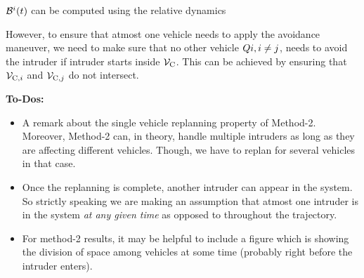 $\mathcal{B}^i(t)$ can be computed using the relative dynamics 

However, to ensure that atmost one vehicle needs to apply the avoidance maneuver, we need to make sure that no other vehicle $Q{i}, i \neq j$, needs to avoid the intruder if intruder starts inside $\mathcal{V}_\text{C}$. This can  be achieved by ensuring that $\mathcal{V}_{\text{C},i}$ and $\mathcal{V}_{\text{C},j}$ do not intersect.







\textbf{To-Dos:}
\begin{itemize}
\item A remark about the single vehicle replanning property of Method-2. Moreover, Method-2 can, in theory, handle multiple intruders as long as they are affecting different vehicles. Though, we have to replan for several vehicles in that case. 
\item Once the replanning is complete, another intruder can appear in the system. So strictly speaking we are making an assumption that atmost one intruder is in the system \textit{at any given time} as opposed to throughout the trajectory.
\item For method-2 results, it may be helpful to include a figure which is showing the division of space among vehicles at some time (probably right before the intruder enters). 
\end{itemize}
